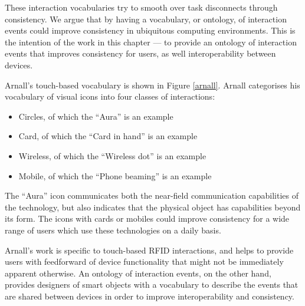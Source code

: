 These interaction vocabularies try to smooth over task disconnects through consistency. We argue that by having a vocabulary, or ontology, of interaction events could improve consistency in ubiquitous computing environments. This is the intention of the work in this chapter --- to provide an ontology of interaction events that improves consistency for users, as well interoperability between devices.

Arnall's touch-based vocabulary is shown in Figure \ref{arnall}. Arnall categorises his vocabulary of visual icons into four classes of interactions: 

\begin{itemize}
	\item Circles, of which the ``Aura'' is an example
	\item Card, of which the ``Card in hand'' is an example
	\item Wireless, of which the ``Wireless dot'' is an example
	\item Mobile, of which the ``Phone beaming'' is an example
\end{itemize}


The ``Aura'' icon communicates both the near-field communication capabilities of the technology, but also indicates that the physical object has capabilities beyond its form. The icons with cards or mobiles could improve consistency for a wide range of users which use these technologies on a daily basis.

Arnall's work is specific to touch-based RFID interactions, and helps to provide users with feedforward of device functionality that might not be immediately apparent otherwise. An ontology of interaction events, on the other hand, provides designers of smart objects with a vocabulary to describe the events that are shared between devices in order to improve interoperability and consistency.











% 
% 
